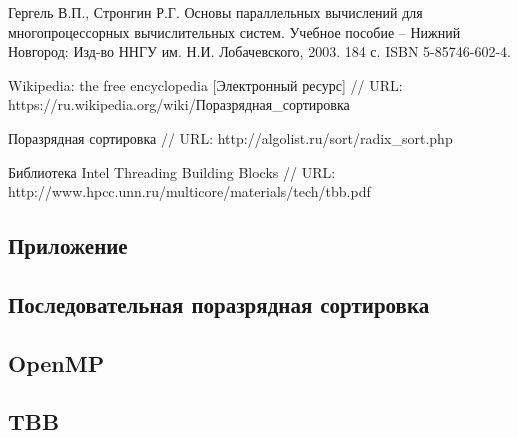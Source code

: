 \documentclass{report}
\begin{document}
\begin{thebibliography}{1}

 Гергель В.П., Стронгин Р.Г. Основы параллельных вычислений для многопроцессорных вычислительных систем. Учебное пособие – Нижний Новгород: Изд-во ННГУ им. Н.И. Лобачевского, 2003. 184 с. ISBN 5-85746-602-4. 

 Wikipedia: the free encyclopedia [Электронный ресурс] // URL: https://ru.wikipedia.org/wiki/Поразрядная\_сортировка

 Поразрядная сортировка // URL: http://algolist.ru/sort/radix\_sort.php

 Библиотека Intel Threading Building Blocks // URL: http://www.hpcc.unn.ru/multicore/materials/tech/tbb.pdf

\end{thebibliography}
\newpage

\begin{center}\section*{Приложение}\end{center}
\subsection{Последовательная поразрядная сортировка}




\subsection{OpenMP}




\subsection{TBB}



\end{document}
